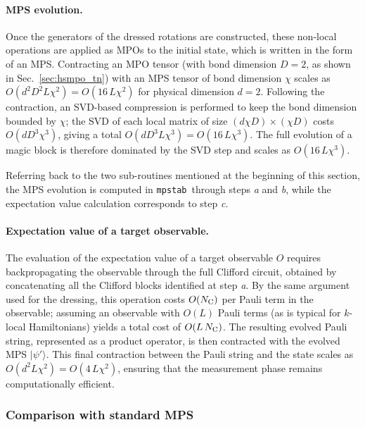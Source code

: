 \documentclass[pra,aps,twocolumn,longbibliography,preprintnumbers,superscriptaddress,nofootnotebib,10pt]{revtex4-2}
\newcommand{\numqubits}{L}  %
\newcommand{\numcliff}{{N_{\rm C}}} %
\newcommand{\mpstab}{\texttt{mpstab}}
\begin{document}
\paragraph{MPS evolution.}
Once the generators of the dressed rotations are constructed, these non-local 
operations are applied as MPOs to the initial state, which is written in the 
form of an MPS. Contracting an MPO tensor (with bond dimension $D=2$, as 
shown in Sec.~\ref{sec:hsmpo_tn}) with an MPS tensor of bond dimension 
$\chi$ scales as $O(d^2 D^2 \numqubits \chi^2) = O(16\,\numqubits \chi^2)$ 
for physical dimension $d=2$. Following the contraction, an SVD-based 
compression is performed to keep the bond dimension bounded by $\chi$; the 
SVD of each local matrix of size $(d\chi D)\times(\chi D)$ costs 
$O(d D^3 \chi^3)$, giving a total 
$O(d D^3 \numqubits \chi^3) = O(16\,\numqubits \chi^3)$. The full evolution 
of a magic block is therefore dominated by the SVD step and scales as 
$O(16\,\numqubits \chi^3)$. 

Referring back to the two sub-routines mentioned at the beginning of this 
section, the MPS evolution is computed in \mpstab\ through steps \textit{a} 
and \textit{b}, while the expectation value calculation corresponds to step 
\textit{c}. \\



\paragraph{Expectation value of a target observable.}
The evaluation of the expectation value of a target observable $O$ requires 
backpropagating the observable through the full Clifford circuit, obtained by 
concatenating all the Clifford blocks identified at step \textit{a}. By the 
same argument used for the dressing, this operation costs $O(\numcliff)$ per 
Pauli term in the observable; assuming an observable with $O(\numqubits)$ 
Pauli terms (as is typical for $k$-local Hamiltonians) yields a total cost 
of $O(\numqubits\,\numcliff)$. The resulting evolved Pauli string, 
represented as a product operator, is then contracted with the evolved MPS 
$|\psi'\rangle$. This final contraction between the Pauli string and the 
state scales as $O(d^2 \numqubits \chi^2) = O(4\,\numqubits \chi^2)$, 
ensuring that the measurement phase remains computationally efficient. \\



\subsubsection{Comparison with standard MPS}
\label{sec:comparison}
\end{document}
